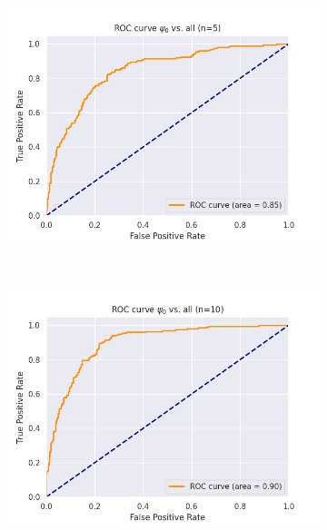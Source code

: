 \begin{figure}[htb]
	\begin{subfigure}{.33\textwidth}
		\centering
		\includegraphics[width=1\linewidth]{figures/AUROC_600samples_class0_llh_n5}
		\caption{}
		\label{fig:sfig2}
	\end{subfigure}\\
	\begin{subfigure}{.33\textwidth}
		\centering
		\includegraphics[width=1\linewidth]{figures/AUROC_600samples_class0_llh_n10}
		\caption{}
		\label{fig:sfig1}
	\end{subfigure}%
	\begin{subfigure}{.33\textwidth}
		\centering

\end{subfigure}
\end{figure}
